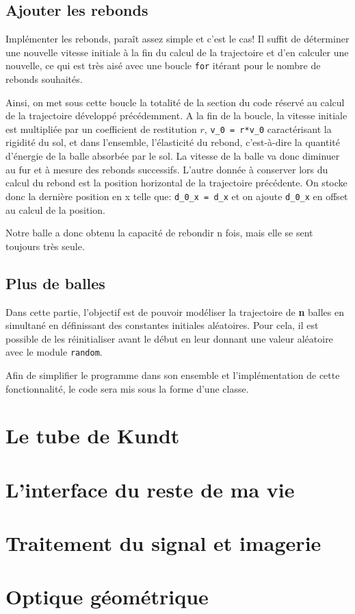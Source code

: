 \documentclass[a4paper,11pt]{article}
\begin{document}
\subsection{Ajouter les rebonds}

Implémenter les rebonds, paraît assez simple et c'est le cas! Il suffit de déterminer une nouvelle vitesse initiale à la fin du calcul de la trajectoire et d'en calculer une nouvelle, ce qui est très aisé avec une boucle \verb|for| itérant pour le nombre de rebonds souhaités.

Ainsi, on met sous cette boucle la totalité de la section du code réservé au calcul de la trajectoire développé précédemment. A la fin de la boucle, la vitesse initiale est multipliée par un coefficient de restitution $r$, \verb|v_0 = r*v_0| caractérisant la rigidité du sol, et dans l'ensemble, l'élasticité du rebond, c'est-à-dire la quantité d'énergie de la balle absorbée par le sol. La vitesse de la balle va donc diminuer au fur et à mesure des rebonds successifs. L'autre donnée à conserver lors du calcul du rebond est la position horizontal de la trajectoire précédente. On stocke donc la dernière position en x telle que: \verb|d_0_x = d_x| et on ajoute \verb|d_0_x| en offset au calcul de la position. 

Notre balle a donc obtenu la capacité de rebondir n fois, mais elle se sent toujours très seule.

\subsection{Plus de balles}

Dans cette partie, l'objectif est de pouvoir modéliser la trajectoire de \textbf{n} balles en simultané en définissant des constantes initiales aléatoires. Pour cela, il est possible de les réinitialiser avant le début en leur donnant une valeur aléatoire avec le module \verb|random|.

Afin de simplifier le programme dans son ensemble et l'implémentation de cette fonctionnalité, le code sera mis sous la forme d'une classe.


\section{Le tube de Kundt}

\section{L'interface du reste de ma vie}

\section{Traitement du signal et imagerie}
\section{Optique géométrique}
\end{document}
